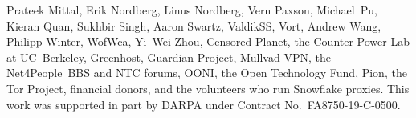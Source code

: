 \documentclass[letterpaper,twocolumn]{article}
\begin{document}
Prateek Mittal, %
Erik Nordberg, %
Linus Nordberg, %
Vern Paxson, %
Michael~Pu, %
Kieran Quan, %
Sukhbir Singh, %
Aaron Swartz,
ValdikSS, %
Vort, %
Andrew Wang, %
Philipp Winter, %
WofWca, %
Yi~Wei Zhou, %
Censored Planet, %
the Counter-Power Lab at UC~Berkeley,
Greenhost, %
Guardian Project, %
Mullvad VPN, %
the Net4People~BBS and NTC forums, %
OONI, %
the Open Technology Fund, %
Pion,
the Tor Project,
financial donors,
and the volunteers who run Snowflake proxies.
This work was supported in part by DARPA
under Contract No.~FA8750-19-C-0500.

{
\raggedright


}
\end{document}
